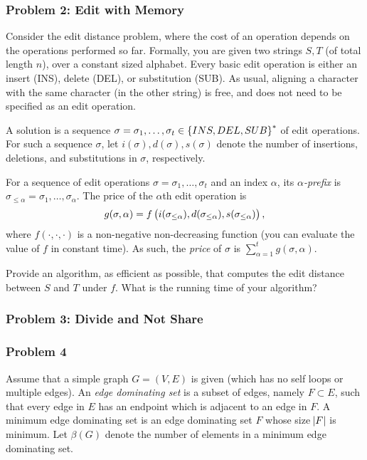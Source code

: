 \documentclass{article}
\begin{document}
\subsubsection{Problem 2: Edit with Memory}
Consider the edit distance problem, where the cost of an operation depends on the operations performed so far. Formally, you are given two strings \(S,T\) (of total length \(n\)), over a constant sized alphabet. Every basic edit operation is either an insert (INS), delete (DEL), or substitution (SUB). As usual, aligning a character with the same character (in the other string) is free, and does not need to be specified as an edit operation.

A solution is a sequence \(\sigma = \sigma_1, \dots, \sigma_t \in \set{INS, DEL, SUB}^*\) of edit operations. For such a sequence \(\sigma\), let \(i(\sigma), d(\sigma), s(\sigma)\) denote the number of insertions, deletions, and substitutions in \(\sigma\), respectively.

For a sequence of edit operations \(\sigma = \sigma_1, \dots, \sigma_t\) and an index \(\alpha\), its \emph{\(\alpha\)-prefix} is \(\sigma_{\leq \alpha} = \sigma_1, \dots, \sigma_\alpha\). The price of the \(\alpha\)th edit operation is
\[
	g(\sigma, \alpha)
	=%
	f \del{i(\sigma_{\leq \alpha}), d(\sigma_{\leq \alpha}), s(\sigma_{\leq \alpha})},
\]
where \(f(\cdot, \cdot, \cdot)\) is a non-negative non-decreasing function (you can evaluate the value of \(f\) in constant time). As such, the \emph{price} of \(\sigma\) is \(\sum_{\alpha = 1}^{t} g(\sigma, \alpha)\).

Provide an algorithm, as efficient as possible, that computes the edit distance between \(S\) and \(T\) under \(f\). What is the running time of your algorithm?

\subsubsection{Problem 3: Divide and Not Share}

\subsubsection{Problem 4}
Assume that a simple graph \(G = (V,E)\) is given (which has no self loops or multiple edges). An \emph{edge dominating set} is a subset of edges, namely \(F \subset E\), such that every edge in \(E\) has an endpoint which is adjacent to an edge in \(F\). A minimum edge dominating set is an edge dominating set \(F\) whose size \(\abs{F}\) is minimum. Let \(\beta(G)\) denote the number of elements in a minimum edge dominating set.
\end{document}
